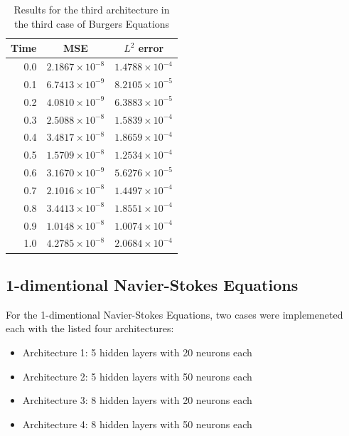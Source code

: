 \documentclass[12pt,letterpaper]{article}
\begin{document}
      \begin{table}[H]
        \begin{center}
        \begin{tabular}{ r | c  c }
        \textbf{Time} & \textbf{MSE} & \textbf{$L^2$ error} \\ \hline
        0.0 & $ 2.1867\times 10^{-8}$ & $ 1.4788\times 10^{-4} $ \\
        0.1 & $ 6.7413\times 10^{-9}$ & $ 8.2105\times 10^{-5} $ \\
        0.2 & $ 4.0810\times 10^{-9}$ & $ 6.3883\times 10^{-5} $ \\
        0.3 & $ 2.5088\times 10^{-8}$ & $ 1.5839\times 10^{-4} $ \\
        0.4 & $ 3.4817\times 10^{-8}$ & $ 1.8659\times 10^{-4} $ \\
        0.5 & $ 1.5709\times 10^{-8}$ & $ 1.2534\times 10^{-4} $ \\
        0.6 & $ 3.1670\times 10^{-9}$ & $ 5.6276\times 10^{-5} $ \\
        0.7 & $ 2.1016\times 10^{-8}$ & $ 1.4497\times 10^{-4} $ \\
        0.8 & $ 3.4413\times 10^{-8}$ & $ 1.8551\times 10^{-4} $ \\
        0.9 & $ 1.0148\times 10^{-8}$ & $ 1.0074\times 10^{-4} $ \\
        1.0 & $ 4.2785\times 10^{-8}$ & $ 2.0684\times 10^{-4} $ \\
        \end{tabular}
        \caption{Results for the third architecture in the third case of Burgers Equations}
        \label{tab:B33}
        \end{center}
        \end{table}  

\subsection{1-dimentional Navier-Stokes Equations}

For the 1-dimentional Navier-Stokes Equations, two cases were implemeneted each with the listed four architectures:

\begin{itemize}
  \item Architecture 1: 5 hidden layers with 20 neurons each
  \item Architecture 2: 5 hidden layers with 50 neurons each
  \item Architecture 3: 8 hidden layers with 20 neurons each
  \item Architecture 4: 8 hidden layers with 50 neurons each
\end{itemize}
\end{document}
